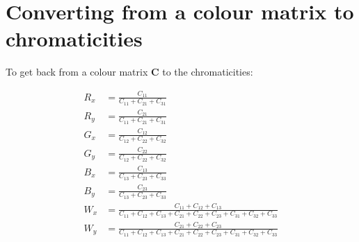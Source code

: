\documentclass{article}
\begin{document}
\section{Converting from a colour matrix to chromaticities}

To get back from a colour matrix $\mathbf{C}$ to the chromaticities:

\begin{align}
R_x &= \frac{C_{11}}{C_{11} + C_{21} + C_{31}} \\
R_y &= \frac{C_{21}}{C_{11} + C_{21} + C_{31}} \\
G_x &= \frac{C_{12}}{C_{12} + C_{22} + C_{32}} \\
G_y &= \frac{C_{22}}{C_{12} + C_{22} + C_{32}} \\
B_x &= \frac{C_{13}}{C_{13} + C_{23} + C_{33}} \\
B_y &= \frac{C_{23}}{C_{13} + C_{23} + C_{33}} \\
W_x &= \frac{C_{11} + C_{12} + C_{13}}{C_{11} + C_{12} + C_{13} + C_{21} + C_{22} + C_{23} + C_{31} + C_{32} + C_{33}} \\
W_y &= \frac{C_{21} + C_{22} + C_{23}}{C_{11} + C_{12} + C_{13} + C_{21} + C_{22} + C_{23} + C_{31} + C_{32} + C_{33}}
\end{align}
\end{document}
